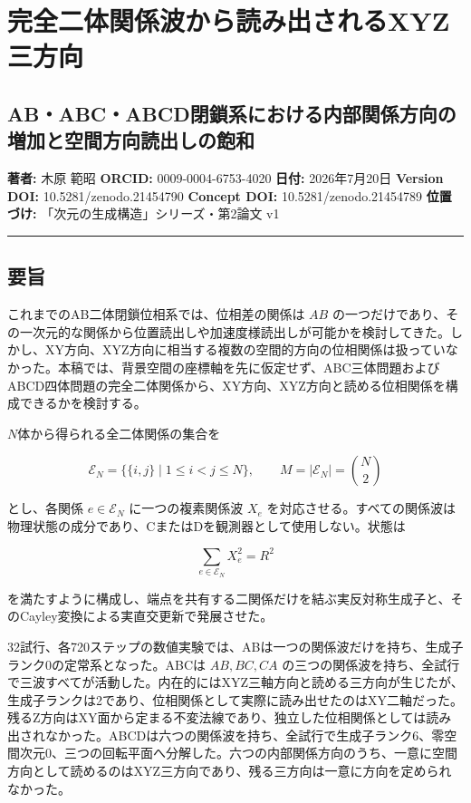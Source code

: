 \documentclass[
  10pt,
  a4paper,
]{article}
\author{}
\date{}
\begin{document}
\section{完全二体関係波から読み出されるXYZ三方向}\label{ux5b8cux5168ux4e8cux4f53ux95a2ux4fc2ux6ce2ux304bux3089ux8aadux307fux51faux3055ux308cux308bxyzux4e09ux65b9ux5411}

\subsection{AB・ABC・ABCD閉鎖系における内部関係方向の増加と空間方向読出しの飽和}\label{ababcabcdux9589ux9396ux7cfbux306bux304aux3051ux308bux5185ux90e8ux95a2ux4fc2ux65b9ux5411ux306eux5897ux52a0ux3068ux7a7aux9593ux65b9ux5411ux8aadux51faux3057ux306eux98fdux548c}

\textbf{著者:} 木原 範昭 \textbf{ORCID:} 0009-0004-6753-4020
\textbf{日付:} 2026年7月20日 \textbf{Version DOI:}
10.5281/zenodo.21454790 \textbf{Concept DOI:} 10.5281/zenodo.21454789
\textbf{位置づけ:} 「次元の生成構造」シリーズ・第2論文 v1

\begin{center}\rule{0.5\linewidth}{0.5pt}\end{center}

\subsection{要旨}\label{ux8981ux65e8}

これまでのAB二体閉鎖位相系では、位相差の関係は \(AB\)
の一つだけであり、その一次元的な関係から位置読出しや加速度様読出しが可能かを検討してきた。しかし、XY方向、XYZ方向に相当する複数の空間的方向の位相関係は扱っていなかった。本稿では、背景空間の座標軸を先に仮定せず、ABC三体問題およびABCD四体問題の完全二体関係から、XY方向、XYZ方向と読める位相関係を構成できるかを検討する。

\(N\)体から得られる全二体関係の集合を

\[
\mathcal E_N
=
\bigl\{\{i,j\}\mid 1\le i<j\le N\bigr\},
\qquad
M=\lvert\mathcal E_N\rvert=\binom{N}{2}
\]

とし、各関係 \(e\in\mathcal E_N\) に一つの複素関係波 \(X_e\)
を対応させる。すべての関係波は物理状態の成分であり、CまたはDを観測器として使用しない。状態は

\[
\sum_{e\in\mathcal E_N}X_e^2=R^2
\]

を満たすように構成し、端点を共有する二関係だけを結ぶ実反対称生成子と、そのCayley変換による実直交更新で発展させた。

32試行、各720ステップの数値実験では、ABは一つの関係波だけを持ち、生成子ランク0の定常系となった。ABCは
\(AB,BC,CA\)
の三つの関係波を持ち、全試行で三波すべてが活動した。内在的にはXYZ三軸方向と読める三方向が生じたが、生成子ランクは2であり、位相関係として実際に読み出せたのはXY二軸だった。残るZ方向はXY面から定まる不変法線であり、独立した位相関係としては読み出されなかった。ABCDは六つの関係波を持ち、全試行で生成子ランク6、零空間次元0、三つの回転平面へ分解した。六つの内部関係方向のうち、一意に空間方向として読めるのはXYZ三方向であり、残る三方向は一意に方向を定められなかった。
\end{document}
